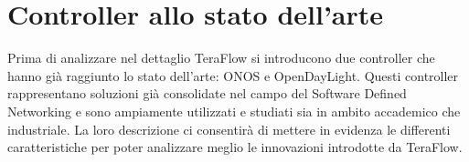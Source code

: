 


\section{Controller allo stato dell'arte}
Prima di analizzare nel dettaglio TeraFlow si introducono due controller che hanno già raggiunto lo stato dell'arte: ONOS e OpenDayLight.
Questi controller rappresentano soluzioni già consolidate nel campo del Software Defined Networking e sono ampiamente utilizzati e studiati sia in ambito accademico che industriale.
La loro descrizione ci consentirà di mettere in evidenza le differenti caratteristiche per poter analizzare meglio le innovazioni introdotte da TeraFlow.

